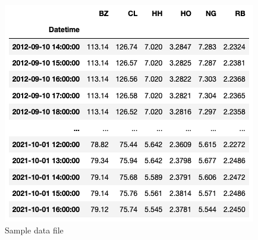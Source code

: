 \begin{figure}[h]
    \centering
    \includegraphics[scale=0.5]{background/Screenshot 2023-01-25 at 00.08.54.png}
    \caption{Sample data file}
    \label{fig:my_label}
\end{figure}

